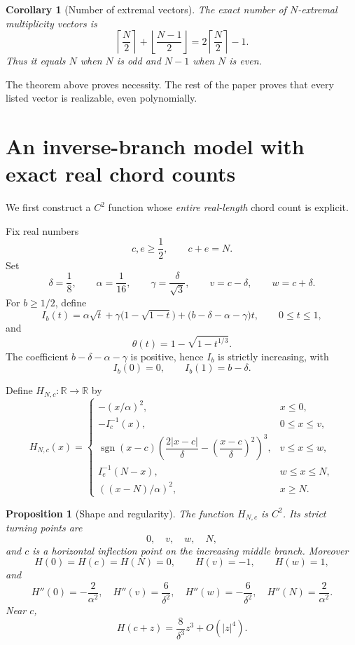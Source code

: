 \documentclass[11pt]{article}
\newtheorem{proposition}[theorem]{Proposition}
\newtheorem{corollary}[theorem]{Corollary}
\theoremstyle{definition}
\theoremstyle{remark}
\newcommand{\R}{\mathbb{R}}
\begin{document}
\begin{corollary}[Number of extremal vectors]\label{cor:count}
The exact number of \(N\)-extremal multiplicity vectors is
\[
\left\lceil\frac N2\right\rceil
+
\left\lfloor\frac{N-1}{2}\right\rfloor
=
2\left\lceil\frac N2\right\rceil-1.
\]
Thus it equals \(N\) when \(N\) is odd and \(N-1\) when \(N\) is even.
\end{corollary}

The theorem above proves necessity.  The rest of the paper proves that
every listed vector is realizable, even polynomially.

\section{An inverse-branch model with exact real chord counts}

We first construct a \(C^2\) function whose \emph{entire real-length}
chord count is explicit.

Fix real numbers
\[
c,e\ge\frac12,\qquad c+e=N.
\]
Set
\[
\delta=\frac18,\qquad
\alpha=\frac1{16},\qquad
\gamma=\frac{\delta}{\sqrt3},
\qquad
v=c-\delta,\qquad w=c+\delta.
\]
For \(b\ge1/2\), define
\[
I_b(t)
=
\alpha\sqrt t
+\gamma\bigl(1-\sqrt{1-t}\bigr)
+\bigl(b-\delta-\alpha-\gamma\bigr)t,
\qquad 0\le t\le1,
\]
and
\[
\theta(t)=1-\sqrt{1-t^{1/3}}.
\]
The coefficient \(b-\delta-\alpha-\gamma\) is positive, hence
\(I_b\) is strictly increasing, with
\[
I_b(0)=0,\qquad I_b(1)=b-\delta.
\]

Define \(H_{N,c}:\R\to\R\) by
\[
H_{N,c}(x)=
\begin{cases}
-(x/\alpha)^2,
&x\le0,\\[1mm]
-I_c^{-1}(x),
&0\le x\le v,\\[1mm]
\operatorname{sgn}(x-c)
\left(
\dfrac{2|x-c|}{\delta}
-\left(\dfrac{x-c}{\delta}\right)^2
\right)^3,
&v\le x\le w,\\[3mm]
I_e^{-1}(N-x),
&w\le x\le N,\\[1mm]
((x-N)/\alpha)^2,
&x\ge N.
\end{cases}
\tag{6.1}\label{eq:H}
\]

\begin{proposition}[Shape and regularity]\label{prop:Hshape}
The function \(H_{N,c}\) is \(C^2\).  Its strict turning points are
\[
0,\quad v,\quad w,\quad N,
\]
and \(c\) is a horizontal inflection point on the increasing middle
branch.  Moreover
\[
H(0)=H(c)=H(N)=0,\qquad
H(v)=-1,\qquad H(w)=1,
\]
and
\[
H''(0)=-\frac2{\alpha^2},\quad
H''(v)=\frac6{\delta^2},\quad
H''(w)=-\frac6{\delta^2},\quad
H''(N)=\frac2{\alpha^2}.
\]
Near \(c\),
\[
H(c+z)=\frac{8}{\delta^3}z^3+O(|z|^4).
\]
\end{proposition}
\end{document}
